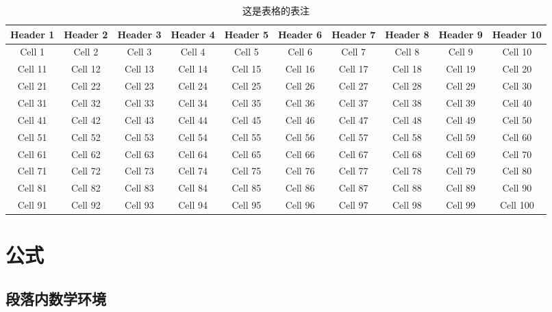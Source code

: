 \documentclass[AutoFakeBold,a4paper]{ctexart}
\begin{document}
\begin{table}
    \centering
    \caption{这是表格的表注}
    \begin{tabular}{cccccccccc}
        \toprule
        Header 1 & Header 2 & Header 3 & Header 4 & Header 5 & Header 6 & Header 7 & Header 8 & Header 9 & Header 10 \\
        \midrule
        Cell 1 & Cell 2 & Cell 3 & Cell 4 & Cell 5 & Cell 6 & Cell 7 & Cell 8 & Cell 9 & Cell 10 \\ [5ex]
        Cell 11 & Cell 12 & Cell 13 & Cell 14 & Cell 15 & Cell 16 & Cell 17 & Cell 18 & Cell 19 & Cell 20 \\ [5ex]
        Cell 21 & Cell 22 & Cell 23 & Cell 24 & Cell 25 & Cell 26 & Cell 27 & Cell 28 & Cell 29 & Cell 30 \\ [5ex]
        Cell 31 & Cell 32 & Cell 33 & Cell 34 & Cell 35 & Cell 36 & Cell 37 & Cell 38 & Cell 39 & Cell 40 \\ [5ex]
        Cell 41 & Cell 42 & Cell 43 & Cell 44 & Cell 45 & Cell 46 & Cell 47 & Cell 48 & Cell 49 & Cell 50 \\ [5ex]
        Cell 51 & Cell 52 & Cell 53 & Cell 54 & Cell 55 & Cell 56 & Cell 57 & Cell 58 & Cell 59 & Cell 60 \\ [5ex]
        Cell 61 & Cell 62 & Cell 63 & Cell 64 & Cell 65 & Cell 66 & Cell 67 & Cell 68 & Cell 69 & Cell 70 \\ [5ex]
        Cell 71 & Cell 72 & Cell 73 & Cell 74 & Cell 75 & Cell 76 & Cell 77 & Cell 78 & Cell 79 & Cell 80 \\ [5ex]
        Cell 81 & Cell 82 & Cell 83 & Cell 84 & Cell 85 & Cell 86 & Cell 87 & Cell 88 & Cell 89 & Cell 90 \\ [5ex]
        Cell 91 & Cell 92 & Cell 93 & Cell 94 & Cell 95 & Cell 96 & Cell 97 & Cell 98 & Cell 99 & Cell 100 \\

        \bottomrule
    \end{tabular}
    \label{tab:myLargeTable}
\end{table}


\section{公式}

\subsection{段落内数学环境}
\end{document}
